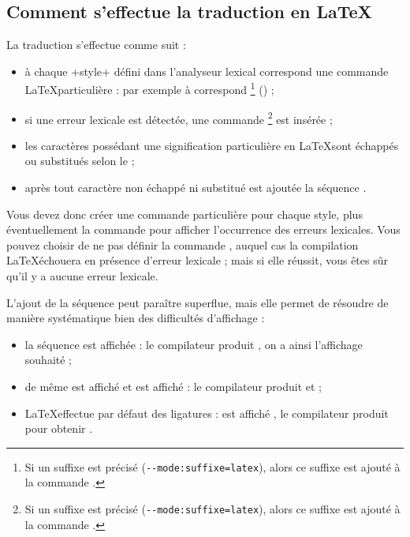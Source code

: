 \subsection{Comment s'effectue la traduction en \LaTeX}

La traduction s'effectue comme suit :
\begin{itemize}
  \item à chaque \ggs+style+ défini dans l'analyseur lexical correspond une commande \LaTeX particulière : par exemple à  correspond \footnote{Si un suffixe est précisé (\texttt{-{}-mode:suffixe=latex}), alors ce suffixe est ajouté à la commande .} () ;
  \item si une erreur lexicale est détectée, une commande \footnote{Si un suffixe est précisé (\texttt{-{}-mode:suffixe=latex}), alors ce suffixe est ajouté à la commande .} est insérée ;
  \item les caractères possédant une signification particulière en \LaTeX sont échappés ou substitués selon le  ;
  \item après tout caractère non échappé ni substitué est ajoutée la séquence \tpp{\{\}}.
\end{itemize}

Vous devez donc créer une commande particulière pour chaque style, plus éventuellement la commande  pour afficher l'occurrence des erreurs lexicales. Vous pouvez choisir de ne pas définir la commande , auquel cas la compilation \LaTeX échouera en présence d'erreur lexicale ; mais si elle réussit, vous êtes sûr qu'il y a aucune erreur lexicale.

L'ajout de la séquence \tpp{\{\}} peut paraître superflue, mais elle permet de résoudre de manière systématique bien des difficultés d'affichage :
\begin{itemize}
  \item la séquence \tpp{-{}-} est affichée \tpp{--} : le compilateur produit \tpp{-\{\}-\{\}}, on a ainsi l'affichage souhaité \tpp{-{}-} ;
  \item de même \tpp{\textgreater{}\textgreater} est affiché \tpp{\textgreater\textgreater} et \tpp{\textless{}\textless} est affiché \tpp{\textless\textless} : le compilateur produit \tpp{\textgreater\{\}\textgreater\{\}} et  \tpp{\textless\{\}\textless\{\}} ;
  \item \LaTeX effectue par défaut des ligatures :  est affiché , le compilateur produit  pour obtenir  .
\end{itemize}



